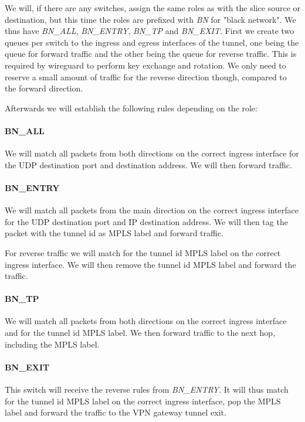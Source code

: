 We will, if there are any switches, assign the same roles as with the slice source or destination, but this time the roles are prefixed with \textit{BN} for "black network". We thus have \textit{BN\_ALL}, \textit{BN\_ENTRY}, \textit{BN\_TP} and \textit{BN\_EXIT}. First we create two queues per switch to the ingress and egress interfaces of the tunnel, one being the queue for forward traffic and the other being the queue for reverse traffic. This is required by wireguard to perform key exchange and rotation. We only need to reserve a small amount of traffic for the reverse direction though, compared to the forward direction.

Afterwards we will establish the following rules depending on the role:

\paragraph{BN\_ALL} We will match all packets from both directions on the correct ingress interface for the UDP destination port and destination address. We will then forward traffic.

\paragraph{BN\_ENTRY} We will match all packets from the main direction on the correct ingress interface for the UDP destination port and IP destination address. We will then tag the packet with the tunnel id as MPLS label and forward traffic.

For reverse traffic we will match for the tunnel id MPLS label on the correct ingress interface. We will then remove the tunnel id MPLS label and forward the traffic.

\paragraph{BN\_TP} We will match all packets from both directions on the correct ingress interface and for the tunnel id MPLS label. We then forward traffic to the next hop, including the MPLS label.

\paragraph{BN\_EXIT} This switch will receive the reverse rules from \textit{BN\_ENTRY}. It will thus match for the tunnel id MPLS label on the correct ingress interface, pop the MPLS label and forward the traffic to the VPN gateway tunnel exit.

